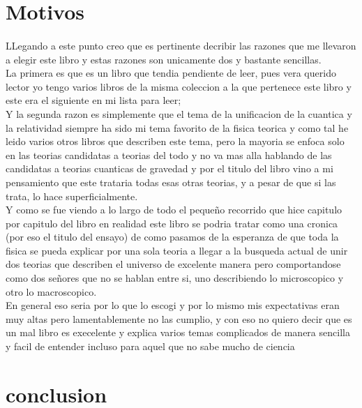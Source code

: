 \documentclass[12pt]{article}
\begin{document}
\section*{ Motivos}
\paragraph*{}
\textsf{LLegando a este punto creo que es pertinente decribir las razones que me llevaron a elegir este libro y estas razones son
unicamente dos y bastante sencillas.\\La primera es que es un libro que tendia pendiente de leer, pues vera querido lector yo tengo
varios libros de la misma coleccion a la que pertenece este libro y este era el siguiente en mi lista para leer;\\
Y la segunda razon es simplemente que el tema de la unificacion de la cuantica y la relatividad siempre ha sido mi tema favorito
de la fisica teorica y como tal he leido varios otros libros que describen este tema, pero la mayoria se enfoca solo en las teorias
candidatas a teorias del todo y no va mas alla hablando de las candidatas a teorias cuanticas de gravedad y por el titulo del libro
vino a mi pensamiento que este trataria todas esas otras teorias, y a pesar de que si las trata, lo hace superficialmente.\\
Y como se fue viendo a lo largo de todo el pequeño recorrido que hice capitulo por capitulo del libro en realidad este libro se 
podria tratar como una cronica (por eso el titulo del ensayo) de como pasamos de la esperanza de que toda la fisica se pueda
explicar por una sola teoria a llegar a la busqueda actual de unir dos teorias que describen el universo de excelente manera
pero comportandose como dos señores que no se hablan entre si, uno describiendo lo microscopico y otro lo macroscopico.\\
En general eso seria por lo que lo escogi y por lo mismo mis expectativas eran muy altas pero lamentablemente no las cumplio, y 
con eso no quiero decir que es un mal libro es execelente y explica varios temas complicados de manera sencilla y facil de entender
incluso para aquel que no sabe mucho de ciencia }
\section*{conclusion}
\end{document}
